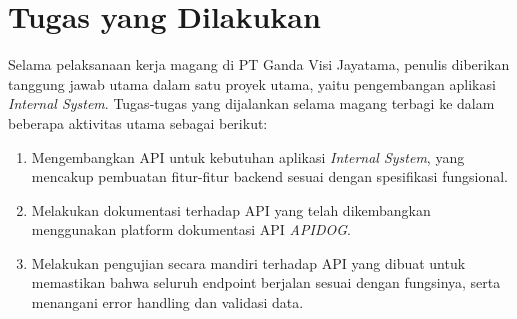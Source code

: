 

\section{Tugas yang Dilakukan}
\label{sec:multiEqu}

Selama pelaksanaan kerja magang di PT Ganda Visi Jayatama, penulis diberikan tanggung jawab utama dalam satu proyek utama, yaitu pengembangan aplikasi \textit{Internal System}. Tugas-tugas yang dijalankan selama magang terbagi ke dalam beberapa aktivitas utama sebagai berikut:

\begin{enumerate}
    \item Mengembangkan API untuk kebutuhan aplikasi \textit{Internal System}, yang mencakup pembuatan fitur-fitur backend sesuai dengan spesifikasi fungsional.
    \item Melakukan dokumentasi terhadap API yang telah dikembangkan menggunakan platform dokumentasi API \textit{APIDOG}.
    \item Melakukan pengujian secara mandiri terhadap API yang dibuat untuk memastikan bahwa seluruh endpoint berjalan sesuai dengan fungsinya, serta menangani error handling dan validasi data.
\end{enumerate}




